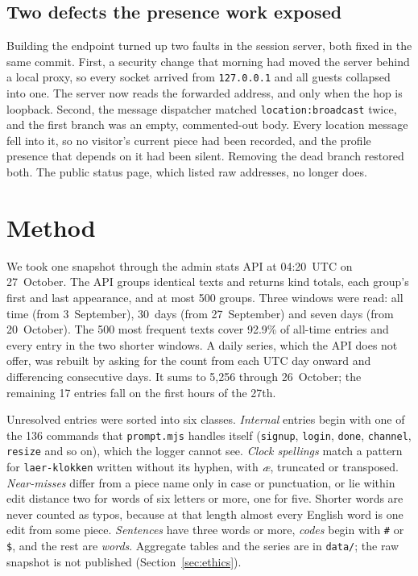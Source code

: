\documentclass[10pt,letterpaper,twocolumn]{article}
\newcommand{\code}[1]{\texttt{#1}}
\begin{document}
\subsection{Two defects the presence work exposed}

Building the endpoint turned up two faults in the session server, both fixed
in the same commit. First, a security change that morning had moved the
server behind a local proxy, so every socket arrived from \code{127.0.0.1}
and all guests collapsed into one. The server now reads the forwarded address,
and only when the hop is loopback. Second, the message dispatcher matched
\code{location:broadcast} twice, and the first branch was an empty,
commented-out body. Every location message fell into it, so no visitor's
current piece had been recorded, and the profile presence that depends on it
had been silent. Removing the dead branch restored both. The public status
page, which listed raw addresses, no longer does.

\section{Method}
\label{sec:method}

We took one snapshot through the admin stats API at 04:20~UTC on
27~October. The API groups identical texts and returns kind totals, each
group's first and last appearance, and at most 500 groups. Three windows were
read: all time (from 3~September), 30~days (from 27~September) and seven days
(from 20~October). The 500 most frequent texts cover 92.9\% of all-time
entries and every entry in the two shorter windows. A daily series, which the
API does not offer, was rebuilt by asking for the count from each UTC day
onward and differencing consecutive days. It sums to 5,256 through
26~October; the remaining 17 entries fall on the first hours of the 27th.

Unresolved entries were sorted into six classes. \emph{Internal} entries begin
with one of the 136 commands that \code{prompt.mjs} handles itself
(\code{signup}, \code{login}, \code{done}, \code{channel}, \code{resize}
and so on), which the logger cannot see. \emph{Clock spellings} match a
pattern for \code{laer-klokken} written without its hyphen, with
\emph{\ae}, truncated or transposed. \emph{Near-misses} differ from a piece
name only in case or punctuation, or lie within edit distance two
\citep{levenshtein1966binary} for words of six letters or more, one for five.
Shorter words are never counted as typos, because at that length almost every
English word is one edit from some piece. \emph{Sentences} have three words or
more, \emph{codes} begin with \code{\#} or \code{\$}, and the rest are
\emph{words}. Aggregate tables and the series are in \code{data/}; the raw
snapshot is not published (Section~\ref{sec:ethics}).
\end{document}
